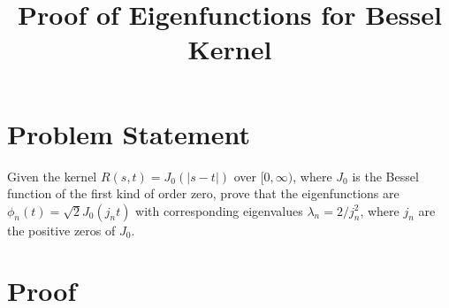 \documentclass{article}
\begin{document}
\title{Proof of Eigenfunctions for Bessel Kernel}
\maketitle

\section{Problem Statement}
Given the kernel $R(s,t) = J_0(|s-t|)$ over $[0, \infty)$, where $J_0$ is the Bessel function of the first kind of order zero, prove that the eigenfunctions are $\phi_n(t) = \sqrt{2} J_0(j_n t)$ with corresponding eigenvalues $\lambda_n = 2 / j_n^2$, where $j_n$ are the positive zeros of $J_0$.

\section{Proof}
\end{document}
